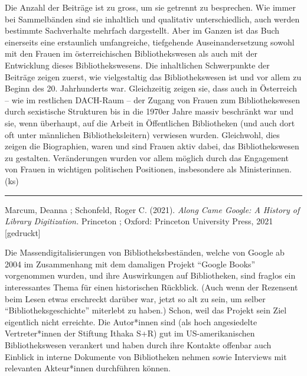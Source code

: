 \documentclass[a4paper,
fontsize=11pt,
oneside,
numbers=noperiodatend,
parskip=half-,
bibliography=totoc,
final
]{scrartcl}
\begin{document}
Die Anzahl der Beiträge ist zu gross, um sie getrennt zu besprechen. Wie
immer bei Sammelbänden sind sie inhaltlich und qualitativ
unterschiedlich, auch werden bestimmte Sachverhalte mehrfach
dargestellt. Aber im Ganzen ist das Buch einerseits eine erstaunlich
umfangreiche, tiefgehende Auseinandersetzung sowohl mit den Frauen im
österreichischen Bibliothekswesen als auch mit der Entwicklung dieses
Bibliothekswesens. Die inhaltlichen Schwerpunkte der Beiträge zeigen
zuerst, wie vielgestaltig das Bibliothekswesen ist und vor allem zu
Beginn des 20. Jahrhunderts war. Gleichzeitig zeigen sie, dass auch in
Österreich -- wie im restlichen DACH-Raum -- der Zugang von Frauen zum
Bibliothekswesen durch sexistische Strukturen bis in die 1970er Jahre
massiv beschränkt war und sie, wenn überhaupt, auf die Arbeit in
Öffentlichen Bibliotheken (und auch dort oft unter männlichen
Bibliotheksleitern) verwiesen wurden. Gleichwohl, dies zeigen die
Biographien, waren und sind Frauen aktiv dabei, das Bibliothekswesen zu
gestalten. Veränderungen wurden vor allem möglich durch das Engagement
von Frauen in wichtigen politischen Positionen, insbesondere als
Ministerinnen. (ks)

\begin{center}\rule{0.5\linewidth}{0.5pt}\end{center}

Marcum, Deanna ; Schonfeld, Roger C. (2021). \emph{Along Came Google: A
History of Library Digitization.} Princeton ; Oxford: Princeton
University Press, 2021 {[}gedruckt{]}

Die Massendigitalisierungen von Bibliotheksbeständen, welche von Google
ab 2004 im Zusammenhang mit dem damaligen Projekt \enquote{Google Books}
vorgenommen wurden, und ihre Auswirkungen auf Bibliotheken, sind fraglos
ein interessantes Thema für einen historischen Rückblick. (Auch wenn der
Rezensent beim Lesen etwas erschreckt darüber war, jetzt so alt zu sein,
um selber \enquote{Bibliotheksgeschichte} miterlebt zu haben.) Schon,
weil das Projekt sein Ziel eigentlich nicht erreichte. Die Autor*innen
sind (als hoch angesiedelte Vertreter*innen der Stiftung Ithaka S+R) gut
im US-amerikanischen Bibliothekswesen verankert und haben durch ihre
Kontakte offenbar auch Einblick in interne Dokumente von Bibliotheken
nehmen sowie Interviews mit relevanten Akteur*innen durchführen können.
\end{document}
